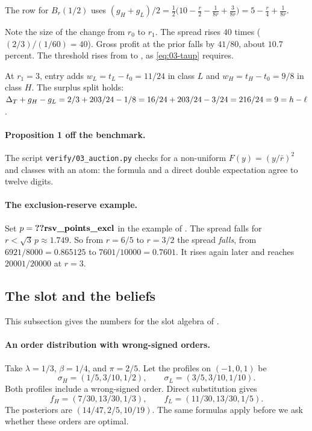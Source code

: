 The row for \(B_r(1/2)\) uses \((g_H+g_L)/2=\tfrac12\bigl(10-\tfrac r2-\tfrac1{8r}+\tfrac3{8r}\bigr)
=5-\tfrac r4+\tfrac1{8r}\).

Note the size of the change from \(r_0\) to \(r_1\). The spread rises \(40\) times
(\((2/3)/(1/60)=40\)). Gross profit at the prior falls by \(41/80\), about \(10.7\) percent.
The threshold rises from  to , as \eqref{eq:03-taup} requires.

At \(r_1=3\), entry adds \(w_L=t_L-t_0=11/24\) in class \(L\) and \(w_H=t_H-t_0=9/8\) in class \(H\).
The surplus split holds: \(\Delta_T+g_H-g_L=2/3+203/24-1/8=16/24+203/24-3/24=216/24=9=h-\ell\).

\paragraph{Proposition 1 off the benchmark.} The script \texttt{verify/03\_auction.py} checks  for a
non-uniform \(F(y)=(y/\bar r)^2\) and classes with an atom: the formula and a direct double expectation
agree to twelve digits.

\paragraph{The exclusion-reserve example.} Set \(p=\reg{rsv_points_excl}\) in the example of
. The spread falls for \(r<\sqrt3\,p\approx1.749\). %
So from \(r=6/5\) to \(r=3/2\) the spread \emph{falls}, from \(6921/8000=0.865125\) to
\(7601/10000=0.7601\). %
It rises again later and reaches \(20001/20000\) at \(r=3\). %

\subsection{The slot and the beliefs}\label{sec:benchmark-slot}

This subsection gives the numbers for the slot algebra of .

\paragraph{An order distribution with wrong-signed orders.}
Take $\lambda=1/3$, $\beta=1/4$, and $\pi=2/5$.
Let the profiles on $(-1,0,1)$ be
\[
\sigma_H=(1/5,3/10,1/2),\qquad \sigma_L=(3/5,3/10,1/10).
\]
Both profiles include a wrong-signed order.
Direct substitution gives
\[
f_H=(7/30,13/30,1/3),\qquad f_L=(11/30,13/30,1/5).
\]
The posteriors are $(14/47,2/5,10/19)$.
The same formulas apply before we ask whether these orders are optimal.

